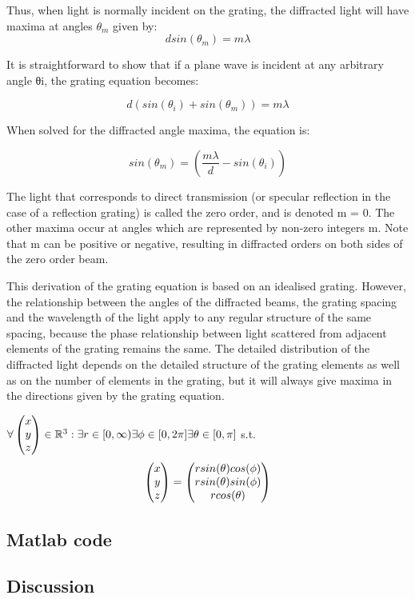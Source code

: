 Thus, when light is normally incident on the grating, the diffracted light will have maxima at angles $\theta_m$ given by:
\begin{equation*}
d sin(\theta_m) = m\lambda
\end{equation*}

It is straightforward to show that if a plane wave is incident at any arbitrary angle θi, the grating equation becomes:

\begin{equation*}
d(sin(\theta_i) + sin(\theta_m)) = m \lambda
\end{equation*}

When solved for the diffracted angle maxima, the equation is:

\begin{equation*}
sin(\theta_m) = \left(\frac{m\lambda}{d}-sin(\theta_i)\right)
\end{equation*}

The light that corresponds to direct transmission (or specular reflection in the case of a reflection grating) is called the zero order, and is denoted m = 0. The other maxima occur at angles which are represented by non-zero integers m. Note that m can be positive or negative, resulting in diffracted orders on both sides of the zero order beam.

This derivation of the grating equation is based on an idealised grating. However, the relationship between the angles of the diffracted beams, the grating spacing and the wavelength of the light apply to any regular structure of the same spacing, because the phase relationship between light scattered from adjacent elements of the grating remains the same. The detailed distribution of the diffracted light depends on the detailed structure of the grating elements as well as on the number of elements in the grating, but it will always give maxima in the directions given by the grating equation.


$\forall \colvec[x]{y}{z} \in \mathbb{R}^3 : \exists r \in [0,\infty) \exists \phi \in [0,2\pi] \exists \theta \in [0,\pi] $ s.t.
\begin{equation*}
\colvec[x]{y}{z} = \colvec[r sin(\theta)cos(\phi)]{r sin(\theta)sin(\phi)}{r cos(\theta)}
\end{equation*}

\subsection{Matlab code}
\subsection{Discussion}


